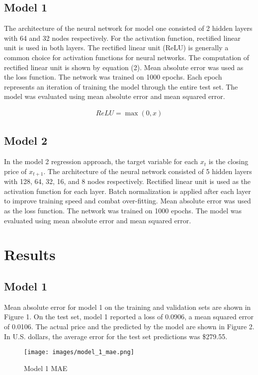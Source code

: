\documentclass[acmtog, authorversion]{acmart}
\begin{document}
\subsection{Model 1}
The architecture of the neural network for model one consisted of 2 hidden layers with 64 and 32 nodes respectively. For the activation function, rectified linear unit is used in both layers. The rectified linear unit (ReLU) is generally a common choice for activation functions for neural networks. The computation of rectified linear unit is shown by equation (2). Mean absolute error was used as the loss function. The network was trained on 1000 epochs. Each epoch represents an iteration of training the model through the entire test set. The model was evaluated using mean absolute error and mean squared error.

\begin{gather}
    ReLU = \max(0,x)
\end{gather}

\subsection{Model 2}
In the model 2 regression approach, the target variable for each $x_t$ is the closing price of $x_{t+1}$. The architecture of the neural network consisted of 5 hidden layers with 128, 64, 32, 16, and 8 nodes respectively. Rectified linear unit is used as the activation function for each layer. Batch normalization is applied after each layer to improve training speed and combat over-fitting. Mean absolute error was used as the loss function. The network was trained on 1000 epochs. The model was evaluated using mean absolute error and mean squared error.

\section{Results}

\subsection{Model 1}
Mean absolute error for model 1 on the training and validation sets are shown in Figure 1. On the test set, model 1 reported a loss of 0.0906, a mean squared error of 0.0106. The actual price and the predicted by the model are shown in Figure 2. In U.S. dollars, the average error for the test set predictions was \$279.55.

\begin{figure}[h]
\caption{Model 1 MAE}
\texttt{[image: images/model\_1\_mae.png]}
\centering
\end{figure}
\end{document}
